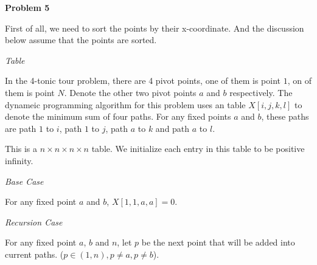 \documentclass[12pt,letterpaper]{article}
\def\pp{\par\noindent}
\newcommand{\problem}[1]{ \bigskip \pp \textbf{Problem #1}\par}
\begin{document}
\problem{5}
First of all, we need to sort the points by their x-coordinate. And the discussion below assume that the points are sorted.\par
\medskip\noindent\textit{Table}\par
In the 4-tonic tour problem, there are 4 pivot points, one of them is point $1$, on of them is point $N$. Denote the other two pivot points $a$ and $b$ respectively. The dynameic programming algorithm for this problem uses an table $X[i,j,k,l]$ to denote the minimum sum of four paths. For any fixed points $a$ and $b$, these paths are path $1$ to $i$, path $1$ to $j$, path $a$ to $k$ and path $a$ to $l$.\par
This is a $n\times n\times n\times n$ table. We initialize each entry in this table to be positive infinity.\par
\medskip\noindent\textit{Base Case}\par
For any fixed point $a$ and $b$, $X[1,1,a,a]=0$.\par
\medskip\noindent\textit{Recursion Case}\par
For any fixed point $a$, $b$ and $n$, let $p$ be the next point that will be added into current paths. ($p\in(1, n), p\neq a, p\neq b$).\par
\end{document}
